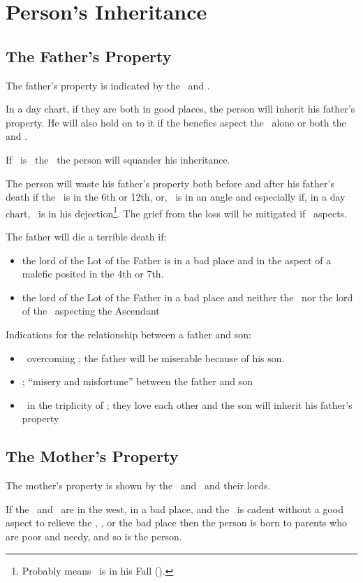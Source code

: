 \section{Person's Inheritance}

\subsection{The Father's Property}
The father's property is indicated by the \Sun\, and \Saturn.

In a day chart, if they are both in good places, the person will inherit his father's property. He will also hold on to it if  the benefics aspect the \Sun\, alone or both the \Sun\, and \Saturn.

If  \Mars\ is \Square\, the \Sun\, the person will squander his inheritance. 

The person will waste his father's property both before and after his father's death if the \Sun\, is in the 6th or 12th, or, \Mars\, is in an angle and especially if, in a day chart, \Saturn\, is in his dejection\footnote{Probably means \Saturn\, is in his Fall (\Aries).}. The grief from the loss will be mitigated if \Jupiter\, aspects.

The father will die a terrible death if:
\begin{itemize}[topsep=0em,itemsep=0em]
\item the lord of the Lot of the Father is in a bad place and in the aspect of a malefic posited in the 4th or 7th.

\item the lord of the Lot of the Father in a bad place and neither the \Sun\, nor the lord of the \Sun\, aspecting the Ascendant
\end{itemize}

Indications for the relationship between a father and son:
\begin{itemize}[topsep=0em,itemsep=0em]

\item  \Jupiter\, overcoming \Saturn; the father will be miserable because of his son.

\item \Jupiter\Opposition\Sun; ``misery and misfortune'' between the father and son

\item \Saturn\, in the triplicity of \Jupiter; they love each other and the son will inherit his father's property
\end{itemize}

\subsection{The Mother's Property}
The mother's property is shown by the \Moon\, and \Venus\, and their lords.

If the \Moon\, and \Venus\, are in the west, in a bad place, and the \Sun\, is cadent without a good aspect to relieve the \Moon, \Venus, or the bad place then the person is born to parents who are poor and needy, and so is the person.



